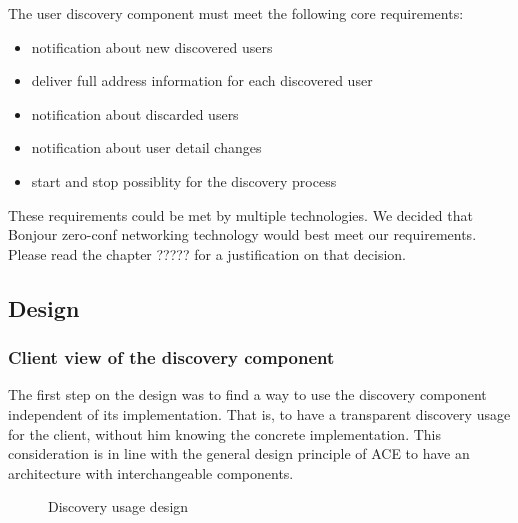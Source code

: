 The user discovery component must meet the following core requirements:

\begin{itemize}
 \item notification about new discovered users
 \item deliver full address information for each discovered user
 \item notification about discarded users
 \item notification about user detail changes
 \item start and stop possiblity for the discovery process 
\end{itemize}

These requirements could be met by multiple technologies. We decided that Bonjour zero-conf networking technology would best meet our requirements. Please read the chapter ????? for a justification on that decision.

\subsection{Design}
\subsubsection{Client view of the discovery component}
The first step on the design was to find a way to use the discovery component independent of its implementation. That is, to have a transparent discovery usage for the client, without him knowing the concrete implementation. This consideration is in line with the general design principle of ACE to have an architecture with interchangeable components.

\begin{figure}[H]
 \centering
 \caption{Discovery usage design}
 \label{fig:network.discovery.usage}
\end{figure}


